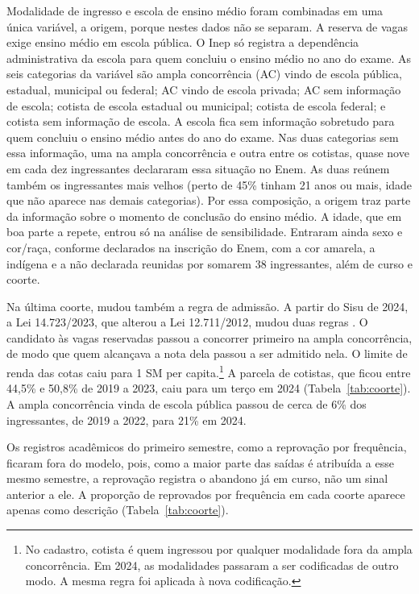 \documentclass[12pt,a4paper]{article}
\begin{document}
Modalidade de ingresso e escola de ensino médio foram combinadas em uma única variável, a origem, porque nestes dados não se separam. A reserva de vagas exige ensino médio em escola pública. O Inep só registra a dependência administrativa da escola para quem concluiu o ensino médio no ano do exame. As seis categorias da variável são ampla concorrência (AC) vindo de escola pública, estadual, municipal ou federal; AC vindo de escola privada; AC sem informação de escola; cotista de escola estadual ou municipal; cotista de escola federal; e cotista sem informação de escola. A escola fica sem informação sobretudo para quem concluiu o ensino médio antes do ano do exame. Nas duas categorias sem essa informação, uma na ampla concorrência e outra entre os cotistas, quase nove em cada dez ingressantes declararam essa situação no Enem. As duas reúnem também os ingressantes mais velhos (perto de 45\% tinham 21 anos ou mais, idade que não aparece nas demais categorias). Por essa composição, a origem traz parte da informação sobre o momento de conclusão do ensino médio. A idade, que em boa parte a repete, entrou só na análise de sensibilidade. Entraram ainda sexo e cor/raça, conforme declarados na inscrição do Enem, com a cor amarela, a indígena e a não declarada reunidas por somarem 38 ingressantes, além de curso e coorte.

Na última coorte, mudou também a regra de admissão. A partir do Sisu de 2024, a Lei 14.723/2023, que alterou a Lei 12.711/2012, mudou duas regras \citep{brasil2012lei12711,brasil2023lei14723}. O candidato às vagas reservadas passou a concorrer primeiro na ampla concorrência, de modo que quem alcançava a nota dela passou a ser admitido nela. O limite de renda das cotas caiu para 1 SM per capita.\footnote{No cadastro, cotista é quem ingressou por qualquer modalidade fora da ampla concorrência. Em 2024, as modalidades passaram a ser codificadas de outro modo. A mesma regra foi aplicada à nova codificação.} A parcela de cotistas, que ficou entre 44,5\% e 50,8\% de 2019 a 2023, caiu para um terço em 2024 (Tabela~\ref{tab:coorte}). A ampla concorrência vinda de escola pública passou de cerca de 6\% dos ingressantes, de 2019 a 2022, para 21\% em 2024.

Os registros acadêmicos do primeiro semestre, como a reprovação por frequência, ficaram fora do modelo, pois, como a maior parte das saídas é atribuída a esse mesmo semestre, a reprovação registra o abandono já em curso, não um sinal anterior a ele. A proporção de reprovados por frequência em cada coorte aparece apenas como descrição (Tabela~\ref{tab:coorte}).
\end{document}
